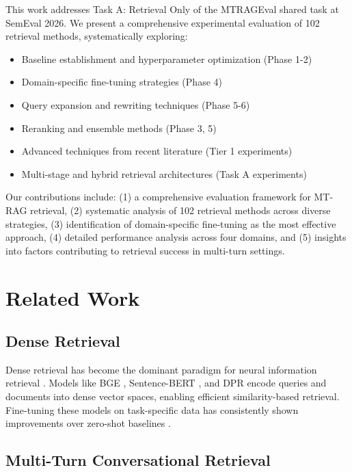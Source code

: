 \documentclass[11pt]{article}
\begin{document}
This work addresses Task A: Retrieval Only of the MTRAGEval shared task at SemEval 2026. We present a comprehensive experimental evaluation of 102 retrieval methods, systematically exploring:

\begin{itemize}
    \item Baseline establishment and hyperparameter optimization (Phase 1-2)
    \item Domain-specific fine-tuning strategies (Phase 4)
    \item Query expansion and rewriting techniques (Phase 5-6)
    \item Reranking and ensemble methods (Phase 3, 5)
    \item Advanced techniques from recent literature (Tier 1 experiments)
    \item Multi-stage and hybrid retrieval architectures (Task A experiments)
\end{itemize}

Our contributions include: (1) a comprehensive evaluation framework for MT-RAG retrieval, (2) systematic analysis of 102 retrieval methods across diverse strategies, (3) identification of domain-specific fine-tuning as the most effective approach, (4) detailed performance analysis across four domains, and (5) insights into factors contributing to retrieval success in multi-turn settings.

\section{Related Work}

\subsection{Dense Retrieval}

Dense retrieval has become the dominant paradigm for neural information retrieval \cite{karpukhin2020dense}. Models like BGE \cite{bge2023}, Sentence-BERT \cite{reimers2019sentence}, and DPR \cite{karpukhin2020dense} encode queries and documents into dense vector spaces, enabling efficient similarity-based retrieval. Fine-tuning these models on task-specific data has consistently shown improvements over zero-shot baselines \cite{thakur2021beir}.

\subsection{Multi-Turn Conversational Retrieval}
\end{document}
